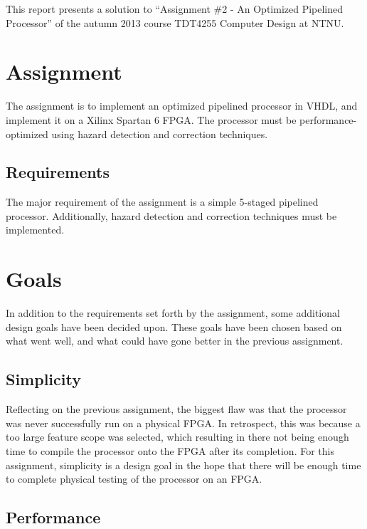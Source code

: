 This report presents a solution to ``Assignment \#2 - An Optimized Pipelined Processor'' of the autumn 2013 course TDT4255 Computer Design at NTNU.

\section{Assignment}

The assignment is to implement an optimized pipelined processor in VHDL, and implement it on a Xilinx Spartan 6 FPGA.
The processor must be performance-optimized using hazard detection and correction techniques.

\subsection{Requirements}

The major requirement of the assignment is a simple 5-staged pipelined processor\cn.
Additionally, hazard detection and correction techniques must be implemented.

\section{Goals}

In addition to the requirements set forth by the assignment, some additional design goals have been decided upon.
These goals have been chosen based on what went well, and what could have gone better in the previous assignment\cn.

\subsection{Simplicity}

Reflecting on the previous assignment\cn, the biggest flaw was that the processor was never successfully run on a physical FPGA.
In retrospect, this was because a too large feature scope was selected, which resulting in there not being enough time to compile the processor onto the FPGA after its completion.
For this assignment, simplicity is a design goal in the hope that there will be enough time to complete physical testing of the processor on an FPGA.

\subsection{Performance}

